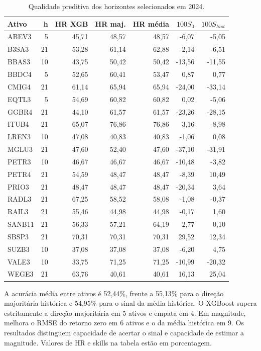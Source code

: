 \begin{table}[H]\centering
\caption{Qualidade preditiva dos horizontes selecionados em 2024.}
{\footnotesize\begin{tabular}{lrrrrrr}\hline
Ativo & h & HR XGB & HR maj. & HR média & $100S_0$ & $100S_{hist}$\\ \hline
ABEV3 & 5 & 45,71 & 48,57 & 48,57 & -6,07 & -5,05\\
B3SA3 & 21 & 53,28 & 61,14 & 62,88 & -2,14 & -6,51\\
BBAS3 & 10 & 43,75 & 50,42 & 50,42 & -13,56 & -11,55\\
BBDC4 & 5 & 52,65 & 60,41 & 53,47 & 0,87 & 0,77\\
CMIG4 & 21 & 61,14 & 65,94 & 65,94 & -24,00 & -33,14\\
EQTL3 & 5 & 54,69 & 60,82 & 60,82 & 0,02 & -5,06\\
GGBR4 & 21 & 44,10 & 61,57 & 61,57 & -23,26 & -28,15\\
ITUB4 & 21 & 65,07 & 76,86 & 76,86 & 3,16 & -8,98\\
LREN3 & 10 & 47,08 & 40,83 & 40,83 & -1,06 & 0,08\\
MGLU3 & 21 & 47,60 & 52,40 & 47,60 & -37,10 & -31,91\\
PETR3 & 10 & 46,67 & 46,67 & 46,67 & -10,48 & -3,82\\
PETR4 & 21 & 54,59 & 48,47 & 48,47 & -8,39 & 10,49\\
PRIO3 & 21 & 48,47 & 48,47 & 48,47 & -20,34 & 3,64\\
RADL3 & 21 & 67,25 & 58,52 & 58,08 & -1,08 & -0,37\\
RAIL3 & 21 & 55,46 & 44,98 & 44,98 & -0,17 & 1,60\\
SANB11 & 21 & 56,33 & 57,21 & 64,19 & 2,77 & 0,10\\
SBSP3 & 21 & 70,31 & 70,31 & 70,31 & 29,52 & 12,34\\
SUZB3 & 10 & 37,08 & 37,08 & 37,08 & -6,20 & 4,75\\
VALE3 & 10 & 33,75 & 71,25 & 71,25 & -10,99 & -20,32\\
WEGE3 & 21 & 63,76 & 40,61 & 40,61 & 16,13 & 25,04\\
\hline\end{tabular}}\par{}\end{table}

A acurácia média entre ativos é 52,44\%, frente a 55,13\% para a direção majoritária histórica e 54,95\% para o sinal da média histórica. O XGBoost supera estritamente a direção majoritária em 5 ativos e empata em 4. Em magnitude, melhora o RMSE do retorno zero em 6 ativos e o da média histórica em 9. Os resultados distinguem capacidade de acertar o sinal e capacidade de estimar a magnitude. Valores de HR e skills na tabela estão em porcentagem.

